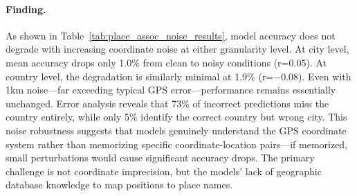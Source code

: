 \paragraph{Finding.}
As shown in Table~\ref{tab:place_assoc_noise_results}, model accuracy does not degrade with increasing coordinate noise at either granularity level. At city level, mean accuracy drops only 1.0\% from clean to noisy conditions (r=0.05). At country level, the degradation is similarly minimal at 1.9\% (r=$-$0.08). Even with 1km noise---far exceeding typical GPS error---performance remains essentially unchanged. Error analysis reveals that 73\% of incorrect predictions miss the country entirely, while only 5\% identify the correct country but wrong city. This noise robustness suggests that models genuinely understand the GPS coordinate system rather than memorizing specific coordinate-location pairs---if memorized, small perturbations would cause significant accuracy drops. The primary challenge is not coordinate imprecision, but the models' lack of geographic database knowledge to map positions to place names.
